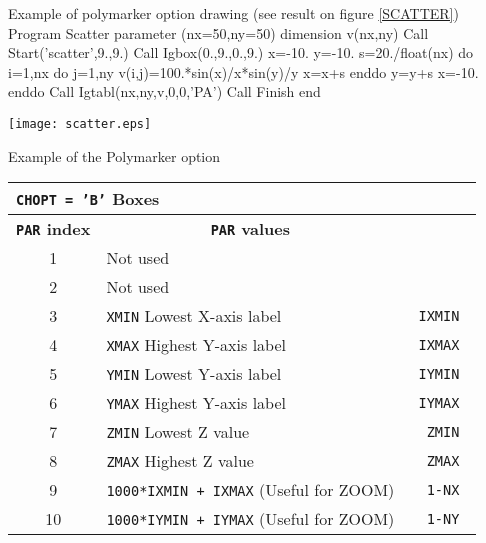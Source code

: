 \bigskip

\begin{XMPt}{Example of polymarker option drawing 
             (see result on figure \ref{SCATTER})}
      Program Scatter 
      parameter (nx=50,ny=50)
      dimension v(nx,ny)
      Call Start('scatter',9.,9.)
      Call Igbox(0.,9.,0.,9.)
      x=-10.
      y=-10.
      s=20./float(nx)
      do i=1,nx
         do j=1,ny
            v(i,j)=100.*sin(x)/x*sin(y)/y
            x=x+s
         enddo
         y=y+s
         x=-10.
      enddo
      Call Igtabl(nx,ny,v,0,0,'PA')
      Call Finish
      end
\end{XMPt}

\begin{Fighere}
\begin{center} \texttt{[image: scatter.eps]} \end{center}
\caption{Example of the \protect{} Polymarker option}
\label{SCATTER}
\end{Fighere}
 
\vfill
\clearpage

\begin{center}
\begin{tabular}{||c|p{11cm}|>{\tt}r||}
\hline
\multicolumn{3}{||l||}{\bf {\tt CHOPT = 'B'} Boxes}               \\
\hline
\multicolumn{1}{||c|}{\bf {\tt PAR} index}              &
\multicolumn{1}{c|}{\bf {\tt PAR} values}               &
\multicolumn{1}{c||}{\bf default}                                 \\
\hline
 1  & Not used                                                      &         \\
 2  & Not used                                                      &         \\
 3  & {\tt XMIN} Lowest X-axis label                                &   IXMIN \\
 4  & {\tt XMAX} Highest Y-axis label                               &   IXMAX \\
 5  & {\tt YMIN} Lowest Y-axis label                                &   IYMIN \\
 6  & {\tt YMAX} Highest Y-axis label                               &   IYMAX \\
 7  & {\tt ZMIN} Lowest Z value                                     &   ZMIN  \\
 8  & {\tt ZMAX} Highest Z value                                    &   ZMAX  \\
 9  & {\tt 1000*IXMIN + IXMAX} (Useful for ZOOM)                    &   1-NX  \\
 10 & {\tt 1000*IYMIN + IYMAX} (Useful for ZOOM)                    &   1-NY  \\
\hline
\end{tabular}
\end{center}

